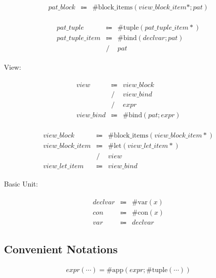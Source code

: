 \begin{align*}
    \begin{array}{rcll}
        \mathit{pat\_block}
        &\Coloneq &\mathrm{\#block\_items}(\mathit{view\_block\_item}{*}; \mathit{pat})
    \end{array}
\end{align*}

\begin{align*}
    \begin{array}{rcll}
        \mathit{pat\_tuple}
        &\Coloneq &\mathrm{\#tuple}(\mathit{pat\_tuple\_item}{*}) \\
        \mathit{pat\_tuple\_item}
        &\Coloneq &\mathrm{\#bind}(\mathit{declvar}; \mathit{pat}) \\
        &\mathrel{/} &\mathit{pat}
    \end{array}
\end{align*}

View:

\begin{align*}
    \begin{array}{rcll}
        \mathit{view}
        &\Coloneq &\mathit{view\_block} \\
        &\mathrel{/} &\mathit{view\_bind} \\
        &\mathrel{/} &\mathit{expr} \\
        \mathit{view\_bind}
        &\Coloneq &\mathrm{\#bind}(\mathit{pat}; \mathit{expr})
    \end{array}
\end{align*}

\begin{align*}
    \begin{array}{rcll}
        \mathit{view\_block}
        &\Coloneq &\mathrm{\#block\_items}(\mathit{view\_block\_item}{*}) \\
        \mathit{view\_block\_item}
        &\Coloneq &\mathrm{\#let}(\mathit{view\_let\_item}{*}) \\
        &\mathrel{/} &\mathit{view} \\
        \mathit{view\_let\_item}
        &\Coloneq &\mathit{view\_bind}
    \end{array}
\end{align*}

Basic Unit:

\begin{align*}
    \begin{array}{rcll}
        \mathit{declvar}
        &\Coloneq &\mathrm{\#var}(x) \\
        \mathit{con}
        &\Coloneq &\mathrm{\#con}(x) \\
        \mathit{var}
        &\Coloneq &\mathit{declvar}
    \end{array}
\end{align*}

\subsection{Convenient Notations}

\begin{align*}
    \mathit{expr}(\cdots) = \mathrm{\#app}(\mathit{expr}; \mathrm{\#tuple}(\cdots))
\end{align*}
